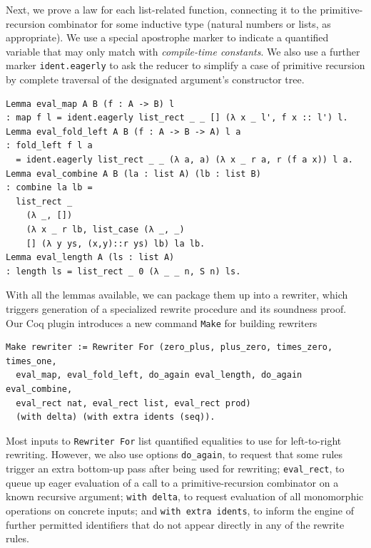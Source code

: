 Next, we prove a law for each list-related function, connecting it to the primitive-recursion combinator for some inductive type (natural numbers or lists, as appropriate).
We use a special apostrophe marker to indicate a quantified variable that may only match with \emph{compile-time constants}.
We also use a further marker \texttt{ident.eagerly} to ask the reducer to simplify a case of primitive recursion by complete traversal of the designated argument's constructor tree.
\begin{verbatim}
Lemma eval_map A B (f : A -> B) l
: map f l = ident.eagerly list_rect _ _ [] (λ x _ l', f x :: l') l.
Lemma eval_fold_left A B (f : A -> B -> A) l a
: fold_left f l a
  = ident.eagerly list_rect _ _ (λ a, a) (λ x _ r a, r (f a x)) l a.
Lemma eval_combine A B (la : list A) (lb : list B)
: combine la lb =
  list_rect _
    (λ _, [])
    (λ x _ r lb, list_case (λ _, _)
    [] (λ y ys, (x,y)::r ys) lb) la lb.
Lemma eval_length A (ls : list A)
: length ls = list_rect _ 0 (λ _ _ n, S n) ls.
\end{verbatim}

With all the lemmas available, we can package them up into a rewriter, which triggers generation of a specialized rewrite procedure and its soundness proof.
Our Coq plugin introduces a new command \texttt{Make} for building rewriters
\begin{verbatim}
Make rewriter := Rewriter For (zero_plus, plus_zero, times_zero, times_one,
  eval_map, eval_fold_left, do_again eval_length, do_again eval_combine,
  eval_rect nat, eval_rect list, eval_rect prod)
  (with delta) (with extra idents (seq)).
\end{verbatim}
Most inputs to \texttt{Rewriter For} list quantified equalities to use for left-to-right rewriting.
However, we also use options \texttt{do_again}, to request that some rules trigger an extra bottom-up pass after being used for rewriting; \texttt{eval_rect}, to queue up eager evaluation of a call to a primitive-recursion combinator on a known recursive argument; \texttt{with delta}, to request evaluation of all monomorphic operations on concrete inputs; and \texttt{with extra idents}, to inform the engine of further permitted identifiers that do not appear directly in any of the rewrite rules.

